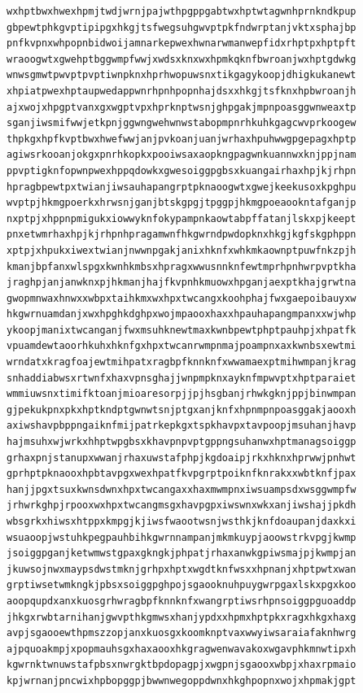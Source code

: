 \documentclass[11pt,letterpaper]{exam}
\begin{document}
\begin{questions}
\begin{verbatim}
wxhptbwxhwexhpmjtwdjwrnjpajwthpgppgabtwxhptwtagwnhprnkndkpup
gbpewtphkgvptipipgxhkgjtsfwegsuhgwvptpkfndwrptanjvktxsphajbp
pnfkvpnxwhpopnbidwoijamnarkepwexhwnarwmanwepfidxrhptpxhptpft
wraoogwtxgwehptbggwmpfwwjxwdsxknxwxhpmkqknfbwroanjwxhptgdwkg
wnwsgmwtpwvptpvptiwnpknxhprhwopuwsnxtikgagykoopjdhigkukanewt
xhpiatpwexhptaupwedappwnrhpnhpopnhajdsxxhkgjtsfknxhpbwroanjh
ajxwojxhpgptvanxgxwgptvpxhprknptwsnjghpgakjmpnpoasggwnweaxtp
sganjiwsmifwwjetkpnjggwngwehwnwstabopmpnrhkuhkgagcwvprkoogew
thpkgxhpfkvptbwxhwefwwjanjpvkoanjuanjwrhaxhpuhwwgpgepagxhptp
agiwsrkooanjokgxpnrhkopkxpooiwsaxaopkngpagwnkuannwxknjppjnam
ppvptigknfopwnpwexhppqdowkxgwesoiggpgbsxkuangairhaxhpjkjrhpn
hpragbpewtpxtwianjiwsauhapangrptpknaoogwtxgwejkeekusoxkpghpu
wvptpjhkmgpoerkxhrwsnjganjbtskgpgjtpggpjhkmgpoeaookntafganjp
nxptpjxhppnpmigukxiowwyknfokypampnkaowtabpffatanjlskxpjkeept
pnxetwmrhaxhpjkjrhpnhpragamwnfhkgwrndpwdopknxhkgjkgfskgphppn
xptpjxhpukxiwextwianjnwwnpgakjanixhknfxwhkmkaownptpuwfnkzpjh
kmanjbpfanxwlspgxkwnhkmbsxhpragxwwusnnknfewtmprhpnhwrpvptkha
jraghpjanjanwknxpjhkmanjhajfkvpnhkmuowxhpganjaexptkhajgrwtna
gwopmnwaxhnwxxwbpxtaihkmxwxhpxtwcangxkoohphajfwxgaepoibauyxw
hkgwrnuamdanjxwxhpghkdghpxwojmpaooxhaxxhpauhapangmpanxxwjwhp
ykoopjmanixtwcanganjfwxmsuhknewtmaxkwnbpewtphptpauhpjxhpatfk
vpuamdewtaoorhkuhxhknfgxhpxtwcanrwmpnmajpoampnxaxkwnbsxewtmi
wrndatxkragfoajewtmihpatxragbpfknnknfxwwamaexptmihwmpanjkrag
snhaddiabwsxrtwnfxhaxvpnsghajjwnpmpknxayknfmpwvptxhptparaiet
wmmiuwsnxtimifktoanjmioaresorpjjpjhsgbanjrhwkgknjppjbinwmpan
gjpekukpnxpkxhptkndptgwnwtsnjptgxanjknfxhpnmpnpoasggakjaooxh
axiwshavpbppngaiknfmijpatrkepkgxtspkhavpxtavpoopjmsuhanjhavp
hajmsuhxwjwrkxhhptwpgbsxkhavpnpvptgppngsuhanwxhptmanagsoiggp
grhaxpnjstanupxwwanjrhaxuwstafphpjkgdoaipjrkxhknxhprwwjpnhwt
gprhptpknaooxhpbtavpgxwexhpatfkvpgrptpoiknfknrakxxwbtknfjpax
hanjjpgxtsuxkwnsdwnxhpxtwcangaxxhaxmwmpnxiwsuampsdxwsggwmpfw
jrhwrkghpjrpooxwxhpxtwcangmsgxhavpgpxiwswnxwkxanjiwshajjpkdh
wbsgrkxhiwsxhtppxkmpgjkjiwsfwaootwsnjwsthkjknfdoaupanjdaxkxi
wsuaoopjwstuhkpegpauhbihkgwrnnampanjmkmkuypjaoowstrkvpgjkwmp
jsoiggpganjketwmwstgpaxgkngkjphpatjrhaxanwkgpiwsmajpjkwmpjan
jkuwsojnwxmaypsdwstmknjgrhpxhptxwgdtknfwsxxhpnanjxhptpwtxwan
grptiwsetwmkngkjpbsxsoiggpghpojsgaooknuhpuygwrpgaxlskxpgxkoo
aoopqupdxanxkuosgrhwragbpfknnknfxwangrptiwsrhpnsoiggpguoaddp
jhkgxrwbtarnihanjgwvpthkgmwsxhanjypdxxhpmxhptpkxragxhkgxhaxg
avpjsgaooewthpmszzopjanxkuosgxkoomknptvaxwwyiwsaraiafaknhwrg
ajpquoakmpjxpopmauhsgxhaxaooxhkgragwenwavakoxwgavphkmnwtipxh
kgwrnktwnuwstafpbsxnwrgktbpdopagpjxwgpnjsgaooxwbpjxhaxrpmaio
kpjwrnanjpncwixhpbopggpjbwwnwegoppdwnxhkghpopnxwojxhpmakjgpt

\end{verbatim}
\end{questions}
\end{document}
